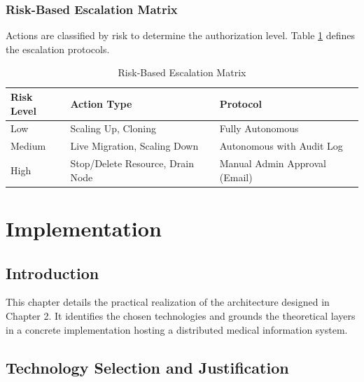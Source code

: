 \documentclass[12pt,a4paper]{report}
\begin{document}
\subsection{Risk-Based Escalation Matrix}
Actions are classified by risk to determine the authorization level. Table \ref{tab:risk_matrix} defines the escalation protocols.

\begin{table}[htbp]
\centering
\caption{Risk-Based Escalation Matrix}
\label{tab:risk_matrix}
\begin{tabular}{@{}lll@{}}
\toprule
\textbf{Risk Level} & \textbf{Action Type} & \textbf{Protocol} \\ \midrule
Low & Scaling Up, Cloning & Fully Autonomous \\
Medium & Live Migration, Scaling Down & Autonomous with Audit Log \\
High & Stop/Delete Resource, Drain Node & Manual Admin Approval (Email) \\ \bottomrule
\end{tabular}
\end{table}

\chapter{Implementation}


\section{Introduction}

This chapter details the practical realization of the architecture designed in Chapter 2. It identifies the chosen technologies and grounds the theoretical layers in a concrete implementation hosting a distributed medical information system.

\section{Technology Selection and Justification}
\end{document}

